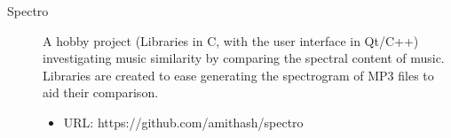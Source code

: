 \begin{description}

\item[Spectro]
A hobby project (Libraries in C, with the user interface in Qt/C++) investigating music similarity by comparing the spectral content of music. Libraries are created to ease generating the spectrogram of MP3 files to aid their comparison.
\begin {itemize}
\item URL: https://github.com/amithash/spectro
\end{itemize}

\end{description}

